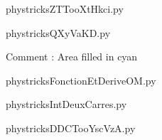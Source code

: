     

    \clearpage
    


    \newcommand{\CaptionFigZTTooXtHkci}{<+Type your caption here+>}
    \begin{center}
        
    \end{center}
    phystricksZTTooXtHkci.py

    

    \clearpage
    


    \newcommand{\CaptionFigQXyVaKD}{<+Type your caption here+>}
    \begin{center}
        
    \end{center}
    phystricksQXyVaKD.py

    Comment : Area filled in cyan

    \clearpage
    


    \newcommand{\CaptionFigFonctionEtDeriveOM}{<+Type your caption here+>}
    \begin{center}
        
    \end{center}
    phystricksFonctionEtDeriveOM.py

    

    \clearpage
    


    \newcommand{\CaptionFigIntDeuxCarres}{<+Type your caption here+>}
    \begin{center}
        
    \end{center}
    phystricksIntDeuxCarres.py

    

    \clearpage
    


    \newcommand{\CaptionFigDDCTooYscVzA}{<+Type your caption here+>}
    \begin{center}
        
    \end{center}
    phystricksDDCTooYscVzA.py

    

    \clearpage
    

